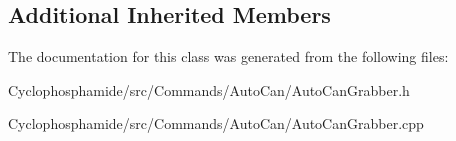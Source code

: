 \subsection*{Additional Inherited Members}


The documentation for this class was generated from the following files\+:\begin{DoxyCompactItemize}
\item 
Cyclophosphamide/src/\+Commands/\+Auto\+Can/Auto\+Can\+Grabber.\+h\item 
Cyclophosphamide/src/\+Commands/\+Auto\+Can/Auto\+Can\+Grabber.\+cpp\end{DoxyCompactItemize}
